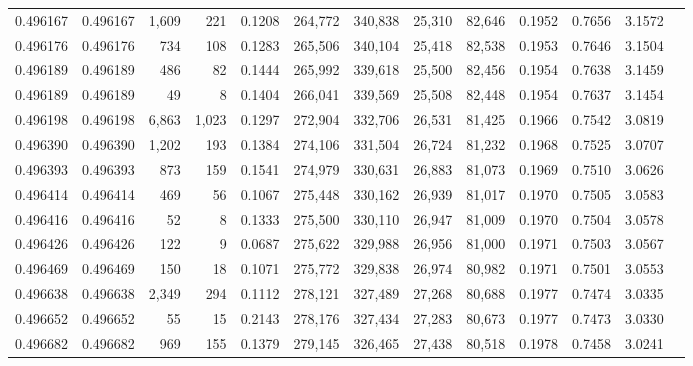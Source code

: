\begin{tabular}{rrrrrrrrrrrrr}
0.496167 & 0.496167 & 1,609 &   221 &                                     0.1208 & 264,772 & 340,838 &  25,310 &  82,646 & 0.1952 & 0.7656 & 3.1572 \\
0.496176 & 0.496176 &   734 &   108 &                                     0.1283 & 265,506 & 340,104 &  25,418 &  82,538 & 0.1953 & 0.7646 & 3.1504 \\
0.496189 & 0.496189 &   486 &    82 &                                     0.1444 & 265,992 & 339,618 &  25,500 &  82,456 & 0.1954 & 0.7638 & 3.1459 \\
0.496189 & 0.496189 &    49 &     8 &                                     0.1404 & 266,041 & 339,569 &  25,508 &  82,448 & 0.1954 & 0.7637 & 3.1454 \\
0.496198 & 0.496198 & 6,863 & 1,023 &                                     0.1297 & 272,904 & 332,706 &  26,531 &  81,425 & 0.1966 & 0.7542 & 3.0819 \\
0.496390 & 0.496390 & 1,202 &   193 &                                     0.1384 & 274,106 & 331,504 &  26,724 &  81,232 & 0.1968 & 0.7525 & 3.0707 \\
0.496393 & 0.496393 &   873 &   159 &                                     0.1541 & 274,979 & 330,631 &  26,883 &  81,073 & 0.1969 & 0.7510 & 3.0626 \\
0.496414 & 0.496414 &   469 &    56 &                                     0.1067 & 275,448 & 330,162 &  26,939 &  81,017 & 0.1970 & 0.7505 & 3.0583 \\
0.496416 & 0.496416 &    52 &     8 &                                     0.1333 & 275,500 & 330,110 &  26,947 &  81,009 & 0.1970 & 0.7504 & 3.0578 \\
0.496426 & 0.496426 &   122 &     9 &                                     0.0687 & 275,622 & 329,988 &  26,956 &  81,000 & 0.1971 & 0.7503 & 3.0567 \\
0.496469 & 0.496469 &   150 &    18 &                                     0.1071 & 275,772 & 329,838 &  26,974 &  80,982 & 0.1971 & 0.7501 & 3.0553 \\
0.496638 & 0.496638 & 2,349 &   294 &                                     0.1112 & 278,121 & 327,489 &  27,268 &  80,688 & 0.1977 & 0.7474 & 3.0335 \\
0.496652 & 0.496652 &    55 &    15 &                                     0.2143 & 278,176 & 327,434 &  27,283 &  80,673 & 0.1977 & 0.7473 & 3.0330 \\
0.496682 & 0.496682 &   969 &   155 &                                     0.1379 & 279,145 & 326,465 &  27,438 &  80,518 & 0.1978 & 0.7458 & 3.0241 \\

\end{tabular}
